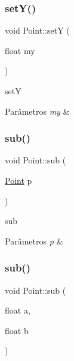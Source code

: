 \subsubsection{\texorpdfstring{set\+Y()}{setY()}}
{\footnotesize\ttfamily void Point\+::setY (\begin{DoxyParamCaption}\item[{float}]{my }\end{DoxyParamCaption})}



setY 


\begin{DoxyParams}{Parâmetros}
{\em my} & \\
\hline
\end{DoxyParams}
\mbox{\label{class_point_a0871d9a460a8d19f27907e74c81c8c28}} 
\subsubsection{\texorpdfstring{sub()}{sub()}\hspace{0.1cm}{\footnotesize\ttfamily [1/2]}}
{\footnotesize\ttfamily void Point\+::sub (\begin{DoxyParamCaption}\item[{\mbox{\hyperlink{class_point}{Point}}}]{p }\end{DoxyParamCaption})}



sub 


\begin{DoxyParams}{Parâmetros}
{\em p} & \\
\hline
\end{DoxyParams}
\mbox{\label{class_point_a99934f79c7e40a4cf6f3ea4bf9b12631}} 
\subsubsection{\texorpdfstring{sub()}{sub()}\hspace{0.1cm}{\footnotesize\ttfamily [2/2]}}
{\footnotesize\ttfamily void Point\+::sub (\begin{DoxyParamCaption}\item[{float}]{a,  }\item[{float}]{b }\end{DoxyParamCaption})}



